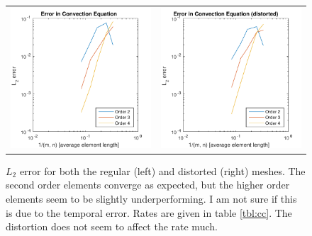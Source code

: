 \documentclass{article}
\begin{document}
\begin{figure}[!ht]
\centering
\begin{tabular}{c c}
\includegraphics[scale=0.8]{cc_err_nodistort.pdf} &
\includegraphics[scale=0.8]{cc_err_distort.pdf}
\end{tabular}
\caption{$L_2$ error for both the regular (left) and distorted (right) meshes. The second order elements converge as expected, but the higher order elements seem to be slightly underperforming. I am not sure if this is due to the temporal error. Rates are given in table \ref{tbl:cc}. The distortion does not seem to affect the rate much.}
\label{fig:cc}
\end{figure}
\end{document}
